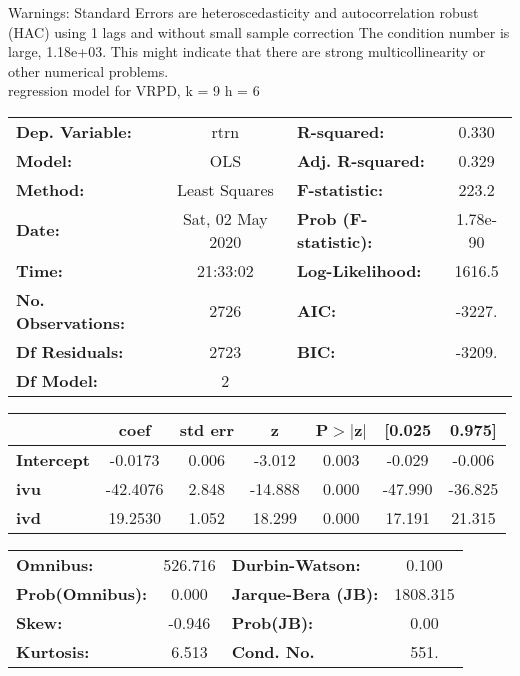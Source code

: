 Warnings: \newline
 [1] Standard Errors are heteroscedasticity and autocorrelation robust (HAC) using 1 lags and without small sample correction \newline
 [2] The condition number is large, 1.18e+03. This might indicate that there are \newline
 strong multicollinearity or other numerical problems.\\ 

regression model for VRPD, k = 9 h = 6\begin{center}
\begin{tabular}{lclc}
\toprule
\textbf{Dep. Variable:}    &       rtrn       & \textbf{  R-squared:         } &     0.330   \\
\textbf{Model:}            &       OLS        & \textbf{  Adj. R-squared:    } &     0.329   \\
\textbf{Method:}           &  Least Squares   & \textbf{  F-statistic:       } &     223.2   \\
\textbf{Date:}             & Sat, 02 May 2020 & \textbf{  Prob (F-statistic):} &  1.78e-90   \\
\textbf{Time:}             &     21:33:02     & \textbf{  Log-Likelihood:    } &    1616.5   \\
\textbf{No. Observations:} &        2726      & \textbf{  AIC:               } &    -3227.   \\
\textbf{Df Residuals:}     &        2723      & \textbf{  BIC:               } &    -3209.   \\
\textbf{Df Model:}         &           2      & \textbf{                     } &             \\
\bottomrule
\end{tabular}
\begin{tabular}{lcccccc}
                   & \textbf{coef} & \textbf{std err} & \textbf{z} & \textbf{P$> |$z$|$} & \textbf{[0.025} & \textbf{0.975]}  \\
\midrule
\textbf{Intercept} &      -0.0173  &        0.006     &    -3.012  &         0.003        &       -0.029    &       -0.006     \\
\textbf{ivu}       &     -42.4076  &        2.848     &   -14.888  &         0.000        &      -47.990    &      -36.825     \\
\textbf{ivd}       &      19.2530  &        1.052     &    18.299  &         0.000        &       17.191    &       21.315     \\
\bottomrule
\end{tabular}
\begin{tabular}{lclc}
\textbf{Omnibus:}       & 526.716 & \textbf{  Durbin-Watson:     } &    0.100  \\
\textbf{Prob(Omnibus):} &   0.000 & \textbf{  Jarque-Bera (JB):  } & 1808.315  \\
\textbf{Skew:}          &  -0.946 & \textbf{  Prob(JB):          } &     0.00  \\
\textbf{Kurtosis:}      &   6.513 & \textbf{  Cond. No.          } &     551.  \\
\bottomrule
\end{tabular}
\end{center}

